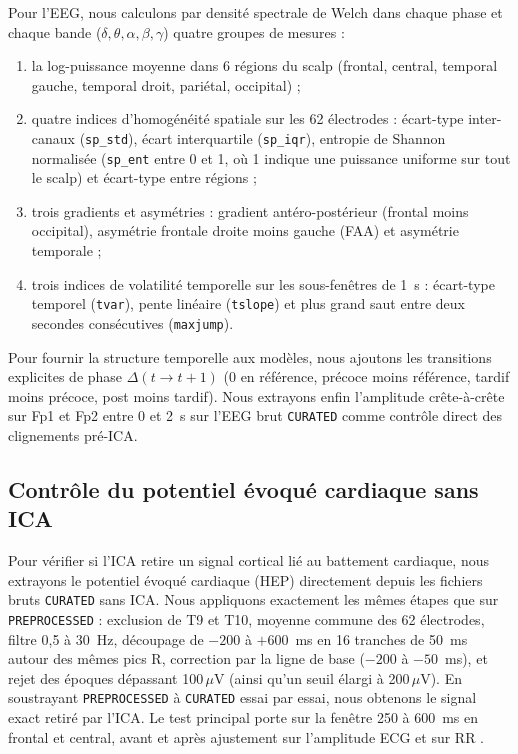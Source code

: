 \documentclass[10pt]{article}
\begin{document}
Pour l'EEG, nous calculons par densité spectrale de Welch dans chaque phase et chaque bande ($\delta, \theta, \alpha, \beta, \gamma$) quatre groupes de mesures :
\begin{enumerate}
\item la log-puissance moyenne dans 6 régions du scalp (frontal, central, temporal gauche, temporal droit, pariétal, occipital) ;
\item quatre indices d'homogénéité spatiale sur les 62 électrodes : écart-type inter-canaux (\texttt{sp\_std}), écart interquartile (\texttt{sp\_iqr}), entropie de Shannon normalisée (\texttt{sp\_ent} entre 0 et 1, où 1 indique une puissance uniforme sur tout le scalp) et écart-type entre régions ;
\item trois gradients et asymétries : gradient antéro-postérieur (frontal moins occipital), asymétrie frontale droite moins gauche (FAA) et asymétrie temporale ;
\item trois indices de volatilité temporelle sur les sous-fenêtres de 1~s : écart-type temporel (\texttt{tvar}), pente linéaire (\texttt{tslope}) et plus grand saut entre deux secondes consécutives (\texttt{maxjump}).
\end{enumerate}

Pour fournir la structure temporelle aux modèles, nous ajoutons les transitions explicites de phase $\Delta(t\to t+1)$ (0 en référence, précoce moins référence, tardif moins précoce, post moins tardif). Nous extrayons enfin l'amplitude crête-à-crête sur Fp1 et Fp2 entre 0 et 2~s sur l'EEG brut \texttt{CURATED} comme contrôle direct des clignements pré-ICA.

\subsection{Contrôle du potentiel évoqué cardiaque sans ICA}

Pour vérifier si l'ICA retire un signal cortical lié au battement cardiaque, nous extrayons le potentiel évoqué cardiaque (HEP) directement depuis les fichiers bruts \texttt{CURATED} sans ICA. Nous appliquons exactement les mêmes étapes que sur \texttt{PREPROCESSED} : exclusion de T9 et T10, moyenne commune des 62 électrodes, filtre 0,5 à 30~Hz, découpage de $-200$ à $+600$~ms en 16 tranches de 50~ms autour des mêmes pics R, correction par la ligne de base ($-200$ à $-50$~ms), et rejet des époques dépassant 100\,$\mu$V (ainsi qu'un seuil élargi à 200\,$\mu$V). En soustrayant \texttt{PREPROCESSED} à \texttt{CURATED} essai par essai, nous obtenons le signal exact retiré par l'ICA. Le test principal porte sur la fenêtre 250 à 600~ms en frontal et central, avant et après ajustement sur l'amplitude ECG et sur RR \cite{parkblanke2019}.
\end{document}
